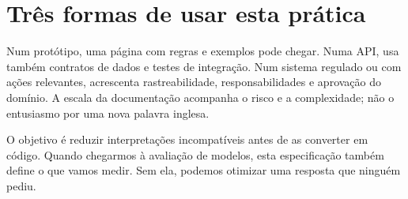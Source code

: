 \section{Três formas de usar esta prática}
Num protótipo, uma página com regras e exemplos pode chegar. Numa API, usa também contratos de dados e testes de integração. Num sistema regulado ou com ações relevantes, acrescenta rastreabilidade, responsabilidades e aprovação do domínio. A escala da documentação acompanha o risco e a complexidade; não o entusiasmo por uma nova palavra inglesa.

O objetivo é reduzir interpretações incompatíveis antes de as converter em código. Quando chegarmos à avaliação de modelos, esta especificação também define o que vamos medir. Sem ela, podemos otimizar uma resposta que ninguém pediu.
